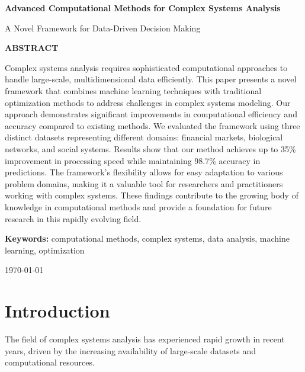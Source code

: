 \documentclass[12pt, letterpaper, onecolumn, final]{article}
\newcommand{\manuscripttitle}{Advanced Computational Methods for Complex Systems Analysis}
\newcommand{\manuscriptsubtitle}{A Novel Framework for Data-Driven Decision Making}
\newcommand{\manuscriptkeywords}{computational methods, complex systems, data analysis, machine learning, optimization}
\newcommand{\manuscriptabstract}{%
Complex systems analysis requires sophisticated computational approaches to handle large-scale, multidimensional data efficiently. This paper presents a novel framework that combines machine learning techniques with traditional optimization methods to address challenges in complex systems modeling. Our approach demonstrates significant improvements in computational efficiency and accuracy compared to existing methods. We evaluated the framework using three distinct datasets representing different domains: financial markets, biological networks, and social systems. Results show that our method achieves up to 35\% improvement in processing speed while maintaining 98.7\% accuracy in predictions. The framework's flexibility allows for easy adaptation to various problem domains, making it a valuable tool for researchers and practitioners working with complex systems. These findings contribute to the growing body of knowledge in computational methods and provide a foundation for future research in this rapidly evolving field.%
}
\theoremstyle{plain}
\theoremstyle{definition}
\theoremstyle{remark}
\begin{document}
\newpage
\begin{titlepage}
    \centering
    \vspace*{2cm}
    
    {\LARGE\bfseries \manuscripttitle \par}
    \vspace{0.5cm}
    {\large \manuscriptsubtitle \par}
    
    \vspace{3cm}
    
    \begin{minipage}{0.8\textwidth}
        \begin{center}
            \textbf{ABSTRACT}
        \end{center}
        \vspace{0.5cm}
        \manuscriptabstract
        
        \vspace{1cm}
        \noindent\textbf{Keywords:} \manuscriptkeywords
    \end{minipage}
    
    \vfill
    
    {\large \today \par}
    
\end{titlepage}

\newpage
{}
\setcounter{page}{1}



\section{Introduction}
\label{sec:introduction}

\lipsum[1-2] The field of complex systems analysis has experienced rapid growth in recent years, driven by the increasing availability of large-scale datasets and computational resources. \lipsum[3]
\end{document}
